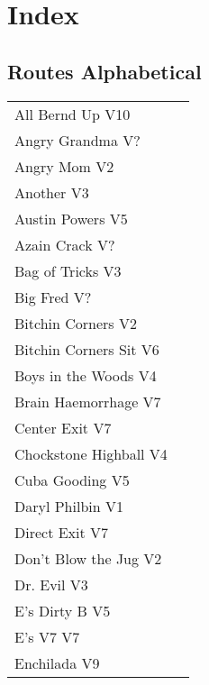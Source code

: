 \chapter{Index}
\lhead{\textcolor{\chapterColor}{\rule[-2pt]{\textwidth}{15pt}}}
\section{Routes Alphabetical}
\begin{center}
\begin{supertabular}{lr}
All Bernd Up V10 & \pageref{rt:All Bernd Up} \\
Angry Grandma V? & \pageref{rt:Angry Grandma} \\
Angry Mom V2 & \pageref{rt:Angry Mom} \\
Another V3 & \pageref{rt:Another} \\
Austin Powers V5 & \pageref{rt:Austin Powers} \\
Azain Crack V? & \pageref{rt:Azain Crack} \\
Bag of Tricks V3 & \pageref{vr:Bag of Tricks} \\
Big Fred V? & \pageref{rt:Big Fred} \\
Bitchin Corners V2 & \pageref{rt:Bitchin Corners} \\
Bitchin Corners Sit V6 & \pageref{vr:Bitchin Corners Sit} \\
Boys in the Woods V4 & \pageref{rt:Boys in the Woods} \\
Brain Haemorrhage V7 & \pageref{vr:Brain Haemorrhage} \\
Center Exit V7 & \pageref{vr:Center Exit} \\
Chockstone Highball V4 & \pageref{rt:Chockstone Highball} \\
Cuba Gooding V5 & \pageref{rt:Cuba Gooding} \\
Daryl Philbin V1 & \pageref{rt:Daryl Philbin} \\
Direct Exit V7 & \pageref{vr:Direct Exit} \\
Don't Blow the Jug V2 & \pageref{rt:Don't Blow the Jug} \\
Dr. Evil V3 & \pageref{rt:Dr. Evil} \\
E's Dirty B V5 & \pageref{rt:E's Dirty B} \\
E's V7 V7 & \pageref{rt:E's V7} \\
Enchilada V9 & \pageref{rt:Enchilada} \\

\end{supertabular}
\end{center}
